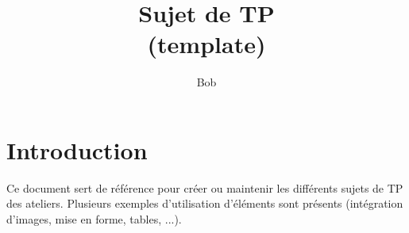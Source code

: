 \documentclass{../sujet-tp-ateliers}
\title{Sujet de TP \\(template)}
\author{Bob}
\begin{document}
\maketitle

\tableofcontents
\newpage

\section{Introduction}

Ce document sert de référence pour créer ou maintenir les différents sujets de TP des ateliers.
Plusieurs exemples d'utilisation d'éléments sont présents (intégration d'images, mise en forme, tables, ...).
\end{document}
